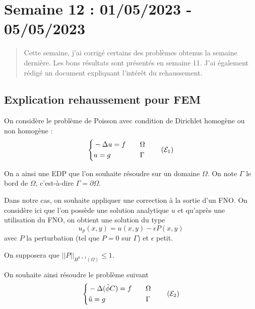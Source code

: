 \section{Semaine 12 : 01/05/2023 - 05/05/2023}
\graphicspath{{semaines/semaine_12/images/}}

\begin{abstract}
	Cette semaine, j'ai corrigé certains des problèmes obtenus la semaine dernière. Les bons résultats sont présentés en semaine 11. J'ai également rédigé un document expliquant l'intérêt du rehaussement.
\end{abstract}

\setlength\parindent{0pt}

\subsection{Explication rehaussement pour FEM}

On considère le problème de Poisson avec condition de Dirichlet homogène ou non homogène :
\begin{equation}
	\label{pb1}
	\left\{\begin{aligned}
		&-\Delta u=f \quad &&\Omega \\
		&u=g \quad &&\Gamma
	\end{aligned}\right. \tag{$\mathcal{E}_1$}
\end{equation}

On a ainsi une EDP que l'on souhaite résoudre sur un domaine $\Omega$. On note $\Gamma$ le bord de $\Omega$, c'est-à-dire $\Gamma=\partial\Omega$. 

Dans notre cas, on souhaite appliquer une correction à la sortie d'un FNO.
On considère ici que l'on possède une solution analytique $u$ et qu'après une utilisation du FNO, on obtient une solution du type
\begin{equation}
	\label{phi_tild}
	u_p(x,y) = u(x,y)-\epsilon P(x,y)
\end{equation}
avec $P$ la perturbation (tel que $P=0$ sur $\Gamma$) et $\epsilon$ petit.

On supposera que $||P||_{H^{k+1}(\Omega)}\le 1$.

On souhaite ainsi résoudre le problème suivant
\begin{equation}
	\label{pb2}
	\left\{\begin{aligned}
		&-\Delta (\tilde{\phi}C)=f \quad &&\Omega \\
		&\tilde{u}=g \quad &&\Gamma
	\end{aligned}\right. \tag{$\mathcal{E}_2$}
\end{equation}

